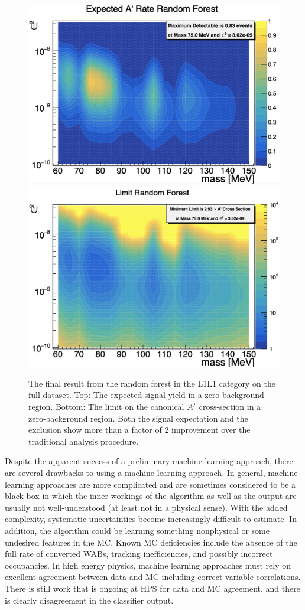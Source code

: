 \begin{figure}[t]
    \centering
    \includegraphics[width=.85\textwidth]{figs/Results/signal_ml.png}
    \includegraphics[width=.85\textwidth]{figs/Results/oim_ml.png}
    \caption{ The final result from the random forest in the L1L1 category on the full dataset. Top: The expected signal yield in a zero-background region. Bottom: The limit on the canonical $A^\prime$ cross-section in a zero-background region. Both the signal expectation and the exclusion show more than a factor of 2 improvement over the traditional analysis procedure.}
    \label{fig:final_oim}
\end{figure}

Despite the apparent success of a preliminary machine learning approach, there are several drawbacks to using a machine learning approach. In general, machine learning approaches are more complicated and are sometimes considered to be a black box in which the inner workings of the algorithm as well as the output are usually not well-understood (at least not in a physical sense). With the added complexity, systematic uncertainties become increasingly difficult to estimate. In addition, the algorithm could be learning something nonphysical or some undesired features in the MC. Known MC deficiencies include the absence of the full rate of converted WABs, tracking inefficiencies, and possibly incorrect occupancies. In high energy physics, machine learning approaches must rely on excellent agreement between data and MC including correct variable correlations. There is still work that is ongoing at HPS for data and MC agreement, and there is clearly disagreement in the classifier output.

